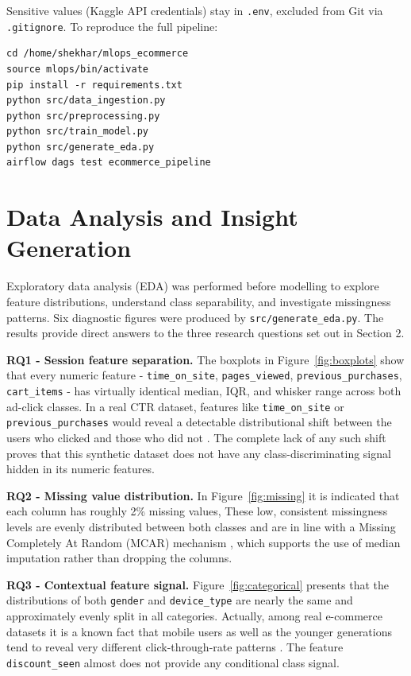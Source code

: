 \documentclass[12pt,a4paper]{article}
\begin{document}
Sensitive values (Kaggle API credentials) stay in \texttt{.env}, excluded from Git via
\texttt{.gitignore}. To reproduce the full pipeline:

\begin{verbatim}
cd /home/shekhar/mlops_ecommerce
source mlops/bin/activate
pip install -r requirements.txt
python src/data_ingestion.py
python src/preprocessing.py
python src/train_model.py
python src/generate_eda.py
airflow dags test ecommerce_pipeline
\end{verbatim}

\section{Data Analysis and Insight Generation}

Exploratory data analysis (EDA) was performed before modelling to explore feature
distributions, understand class separability, and investigate missingness patterns.
Six diagnostic figures were produced by \texttt{src/generate\_eda.py}. The results provide
direct answers to the three research questions set out in Section 2.

\textbf{RQ1 - Session feature separation.} The boxplots in Figure~\ref{fig:boxplots}
show that every numeric feature - \texttt{time\_on\_site}, \texttt{pages\_viewed},
\texttt{previous\_purchases}, \texttt{cart\_items} - has virtually identical median, IQR,
and whisker range across both ad-click classes. 
In a real CTR dataset, features like \texttt{time\_on\_site} or
\texttt{previous\_purchases} would reveal a detectable distributional shift between the users who clicked and those who did not \cite{he2014}. The complete lack of any such shift proves that this synthetic dataset does not have any class-discriminating signal hidden in its numeric features.

\textbf{RQ2 - Missing value distribution.} 
In Figure~\ref{fig:missing} it is indicated that each column has roughly 2\% missing values,
These low, consistent missingness levels are evenly distributed between both classes and are in line with a Missing Completely At Random (MCAR)
mechanism \cite{rubin1976}, which supports the use of median imputation rather than dropping the columns.

\textbf{RQ3 - Contextual feature signal.} Figure~\ref{fig:categorical} presents that the distributions of both
\texttt{gender} and \texttt{device\_type} are nearly the same and approximately evenly split in all categories. Actually, among real e-commerce datasets it is a known fact that mobile users as well as the younger generations tend to reveal very different click-through-rate patterns \cite{richardson2007}. The
feature \texttt{discount\_seen} almost does not provide any conditional class signal. 
\end{document}
